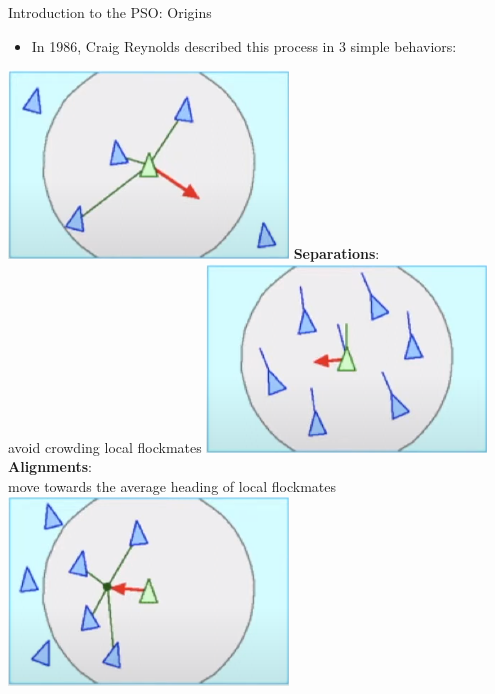 \documentclass[pdflatex,compress,mathserif]{beamer}
\begin{document}
\begin{frame}{Introduction to the PSO: Origins}
	\begin{itemize}
		\item In 1986, Craig Reynolds described this process in 3 simple behaviors:
	\end{itemize}
	\begin{multicols}{3}
		\includegraphics[width=\linewidth]{img/04}
		\scriptsize{\textbf{Separations}:\\
			avoid crowding local flockmates}
		\vfill\null
		\columnbreak
		\includegraphics[width=\linewidth]{img/05}
		\scriptsize{\textbf{Alignments}:\\
			move towards the average heading of local flockmates}
		\vfill\null
		\columnbreak
		\includegraphics[width=\linewidth]{img/06}

\end{multicols}
\end{frame}
\end{document}
